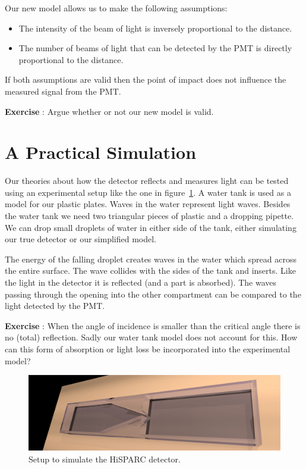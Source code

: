 \documentclass[12pt,a4paper]{article}
\numberwithin{equation}{section}
\numberwithin{figure}{section}
\newcounter{Exercise}
\numberwithin{table}{section}
\begin{document}
Our new model allows us to make the following assumptions:
\begin{itemize}
\item The intensity of the beam of light is inversely proportional to the distance.
\item The number of beams of light that can be detected by the PMT is directly proportional to the distance.
\end{itemize}
If both assumptions are valid then the point of impact does not influence the measured signal from the PMT.

\begin{shaded}
\textbf{Exercise \theExercise {}} : Argue whether or not our new model is valid.\end{shaded}

\section{A Practical Simulation}
Our theories about how the detector reflects and measures light can be tested using an experimental setup like the one in figure~\ref{fig:exp_setup}. A water tank is used as a model for our plastic plates. Waves in the water represent light waves. Besides the water tank we need two triangular pieces of plastic and a dropping pipette. We can drop small droplets of water in either side of the tank, either simulating our true detector or our simplified model.

The energy of the falling droplet creates waves in the water which spread across the entire surface. The wave collides with the sides of the tank and inserts. Like the light in the detector it is reflected (and a part is absorbed). The waves passing through the opening into the other compartment can be compared to the light detected by the PMT.

\begin{shaded}
\textbf{Exercise \theExercise {}} : When the angle of incidence is smaller than the critical angle there is no (total) reflection. Sadly our water tank model does not account for this. How can this form of absorption or light loss be incorporated into the experimental model? \end{shaded}

\begin{figure}[h]\begin{center}
\includegraphics[scale=0.22]{simulatie4.pdf}
\caption{Setup to simulate the HiSPARC detector.}\label{fig:exp_setup}
\end{center}\end{figure}
\end{document}
